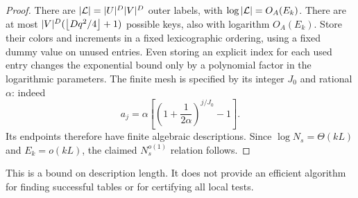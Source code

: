 \begin{proof}
There are
\(|\mathcal L|=|U|^D|V|^D\) outer labels, with
\(\log|\mathcal L|=O_A(E_k)\).
There are at most \(|V|^D(\left\lfloor Dq^2/4\right\rfloor+1)\) possible keys, also with
logarithm \(O_A(E_k)\).
Store their colors and increments in a fixed lexicographic ordering,
using a fixed dummy value on unused entries.
Even storing an explicit index for each used entry changes the
exponential bound only by a polynomial factor in the logarithmic
parameters.
The finite mesh is specified by its integer \(J_0\) and rational
\(\alpha\): indeed
\[
 a_j=\alpha\left[
 \left(1+\frac1{2\alpha}\right)^{j/J_0}-1\right].
\]
Its endpoints therefore have finite algebraic descriptions.
Since \(\log N_s=\Theta(kL)\) and \(E_k=o(kL)\), the claimed
\(N_s^{o(1)}\) relation follows.
\end{proof}

This is a bound on description length. It does not provide an efficient
algorithm for finding successful tables or for certifying all local
tests.
